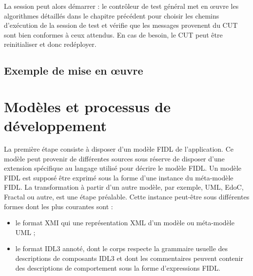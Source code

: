 La session peut alors d\'emarrer : le contr\^oleur de test
g\'en\'eral met en \oe uvre les algorithmes d\'etaill\'es dans le
chapitre pr\'ec\'edent pour choisir les chemins d'ex\'ecution de la
session de test et v\'erifie que les messages provenent du CUT sont
bien conformes \`a ceux attendus. En cas de besoin, le CUT peut
\^etre reinitialiser et donc red\'eployer.

\subsection{Exemple de mise en \oe uvre}



\section{Mod\`eles et processus de d\'eveloppement}

La premi\`ere \'etape consiste \`a disposer d'un mod\`ele
\textsf{FIDL} de l'application. Ce mod\`ele peut provenir de
diff\'erentes sources sous r\'eserve de disposer d'une extension
sp\'ecifique au langage utilis\'e pour d\'ecrire le mod\`ele
FIDL.  Un mod\`ele FIDL est suppos\'e \^etre exprim\'e sous la
forme d'une instance du m\'eta-mod\`ele FIDL. La transformation \`a
partir d'un autre mod\`ele, par exemple, UML, EdoC, Fractal ou autre,
est une \'etape pr\'ealable. Cette instance peut-\^etre sous
diff\'erentes formes dont les plus courantes sont :
\begin{itemize}
  \item le format \textsf{XMI} qui une repr\'esentation XML d'un
  mod\`ele ou m\'eta-mod\`ele \textsf{UML} ;
\item le format \textsf{IDL3} annot\'e, dont le corps respecte la
  grammaire usuelle des descriptions de composants IDL3 et dont les
  commentaires peuvent contenir des descriptions de comportement sous
  la forme d'expressions \textsf{FIDL}. 
\end{itemize}

